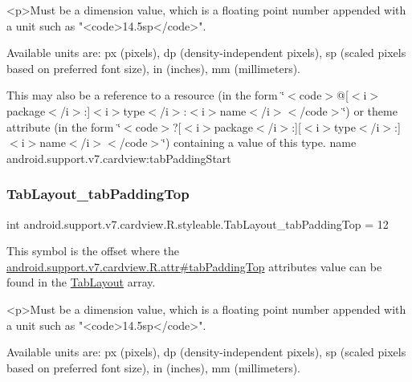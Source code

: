 \begin{DoxyVerb}      <p>Must be a dimension value, which is a floating point number appended with a unit such as "<code>14.5sp</code>".
\end{DoxyVerb}
 Available units are\+: px (pixels), dp (density-\/independent pixels), sp (scaled pixels based on preferred font size), in (inches), mm (millimeters). 

This may also be a reference to a resource (in the form \char`\"{}$<$code$>$@\mbox{[}$<$i$>$package$<$/i$>$\+:\mbox{]}$<$i$>$type$<$/i$>$\+:$<$i$>$name$<$/i$>$$<$/code$>$\char`\"{}) or theme attribute (in the form \char`\"{}$<$code$>$?\mbox{[}$<$i$>$package$<$/i$>$\+:\mbox{]}\mbox{[}$<$i$>$type$<$/i$>$\+:\mbox{]}$<$i$>$name$<$/i$>$$<$/code$>$\char`\"{}) containing a value of this type.  name android.\+support.\+v7.\+cardview\+:tab\+Padding\+Start \mbox{\label{classandroid_1_1support_1_1v7_1_1cardview_1_1R_1_1styleable_a0d0eb9efbce84535b45c5779754d6dd3}} 
\subsubsection{\texorpdfstring{Tab\+Layout\+\_\+tab\+Padding\+Top}{TabLayout\_tabPaddingTop}}
{\footnotesize\ttfamily int android.\+support.\+v7.\+cardview.\+R.\+styleable.\+Tab\+Layout\+\_\+tab\+Padding\+Top = 12\hspace{0.3cm}{\ttfamily [static]}}

This symbol is the offset where the \hyperlink{classandroid_1_1support_1_1v7_1_1cardview_1_1R_1_1attr_affa888541a738a70bd00ff1842fcdf48}{android.\+support.\+v7.\+cardview.\+R.\+attr\#tab\+Padding\+Top} attribute\textquotesingle{}s value can be found in the \hyperlink{classandroid_1_1support_1_1v7_1_1cardview_1_1R_1_1styleable_afa0dc9366603eaec9e38d99273ba8512}{Tab\+Layout} array.

\begin{DoxyVerb}      <p>Must be a dimension value, which is a floating point number appended with a unit such as "<code>14.5sp</code>".
\end{DoxyVerb}
 Available units are\+: px (pixels), dp (density-\/independent pixels), sp (scaled pixels based on preferred font size), in (inches), mm (millimeters). 

